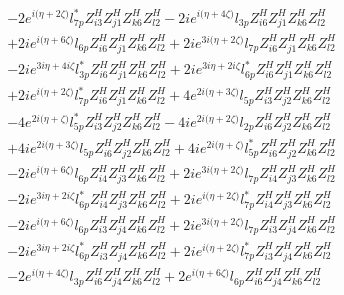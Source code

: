 \begin{align}
 &-2 e^{i \Big(\eta +2 \zeta \Big)} l_{7p}^* Z_{{i 3}}^{H} Z_{{j 1}}^{H} Z_{{k 6}}^{H} Z_{{l 2}}^{H} -2 i e^{i \Big(\eta +4 \zeta \Big)} l_{3p} Z_{{i 6}}^{H} Z_{{j 1}}^{H} Z_{{k 6}}^{H} Z_{{l 2}}^{H} \nonumber \\ 
 &+2 i e^{i \Big(\eta +6 \zeta \Big)} l_{6p} Z_{{i 6}}^{H} Z_{{j 1}}^{H} Z_{{k 6}}^{H} Z_{{l 2}}^{H} +2 i e^{3 i \Big(\eta +2 \zeta \Big)} l_{7p} Z_{{i 6}}^{H} Z_{{j 1}}^{H} Z_{{k 6}}^{H} Z_{{l 2}}^{H} \nonumber \\ 
 &-2 i e^{3 i \eta +4 i \zeta } l_{3p}^* Z_{{i 6}}^{H} Z_{{j 1}}^{H} Z_{{k 6}}^{H} Z_{{l 2}}^{H} +2 i e^{3 i \eta +2 i \zeta } l_{6p}^* Z_{{i 6}}^{H} Z_{{j 1}}^{H} Z_{{k 6}}^{H} Z_{{l 2}}^{H} \nonumber \\ 
 &+2 i e^{i \Big(\eta +2 \zeta \Big)} l_{7p}^* Z_{{i 6}}^{H} Z_{{j 1}}^{H} Z_{{k 6}}^{H} Z_{{l 2}}^{H} +4 e^{2 i \Big(\eta +3 \zeta \Big)} l_{5p} Z_{{i 3}}^{H} Z_{{j 2}}^{H} Z_{{k 6}}^{H} Z_{{l 2}}^{H} \nonumber \\ 
 &-4 e^{2 i \Big(\eta +\zeta \Big)} l_{5p}^* Z_{{i 3}}^{H} Z_{{j 2}}^{H} Z_{{k 6}}^{H} Z_{{l 2}}^{H} -4 i e^{2 i \Big(\eta +2 \zeta \Big)} l_{2p} Z_{{i 6}}^{H} Z_{{j 2}}^{H} Z_{{k 6}}^{H} Z_{{l 2}}^{H} \nonumber \\ 
 &+4 i e^{2 i \Big(\eta +3 \zeta \Big)} l_{5p} Z_{{i 6}}^{H} Z_{{j 2}}^{H} Z_{{k 6}}^{H} Z_{{l 2}}^{H} +4 i e^{2 i \Big(\eta +\zeta \Big)} l_{5p}^* Z_{{i 6}}^{H} Z_{{j 2}}^{H} Z_{{k 6}}^{H} Z_{{l 2}}^{H} \nonumber \\ 
 &-2 i e^{i \Big(\eta +6 \zeta \Big)} l_{6p} Z_{{i 4}}^{H} Z_{{j 3}}^{H} Z_{{k 6}}^{H} Z_{{l 2}}^{H} +2 i e^{3 i \Big(\eta +2 \zeta \Big)} l_{7p} Z_{{i 4}}^{H} Z_{{j 3}}^{H} Z_{{k 6}}^{H} Z_{{l 2}}^{H} \nonumber \\ 
 &-2 i e^{3 i \eta +2 i \zeta } l_{6p}^* Z_{{i 4}}^{H} Z_{{j 3}}^{H} Z_{{k 6}}^{H} Z_{{l 2}}^{H} +2 i e^{i \Big(\eta +2 \zeta \Big)} l_{7p}^* Z_{{i 4}}^{H} Z_{{j 3}}^{H} Z_{{k 6}}^{H} Z_{{l 2}}^{H} \nonumber \\ 
 &-2 i e^{i \Big(\eta +6 \zeta \Big)} l_{6p} Z_{{i 3}}^{H} Z_{{j 4}}^{H} Z_{{k 6}}^{H} Z_{{l 2}}^{H} +2 i e^{3 i \Big(\eta +2 \zeta \Big)} l_{7p} Z_{{i 3}}^{H} Z_{{j 4}}^{H} Z_{{k 6}}^{H} Z_{{l 2}}^{H} \nonumber \\ 
 &-2 i e^{3 i \eta +2 i \zeta } l_{6p}^* Z_{{i 3}}^{H} Z_{{j 4}}^{H} Z_{{k 6}}^{H} Z_{{l 2}}^{H} +2 i e^{i \Big(\eta +2 \zeta \Big)} l_{7p}^* Z_{{i 3}}^{H} Z_{{j 4}}^{H} Z_{{k 6}}^{H} Z_{{l 2}}^{H} \nonumber \\ 
 &-2 e^{i \Big(\eta +4 \zeta \Big)} l_{3p} Z_{{i 6}}^{H} Z_{{j 4}}^{H} Z_{{k 6}}^{H} Z_{{l 2}}^{H} +2 e^{i \Big(\eta +6 \zeta \Big)} l_{6p} Z_{{i 6}}^{H} Z_{{j 4}}^{H} Z_{{k 6}}^{H} Z_{{l 2}}^{H} \nonumber \\ 

\end{align}
